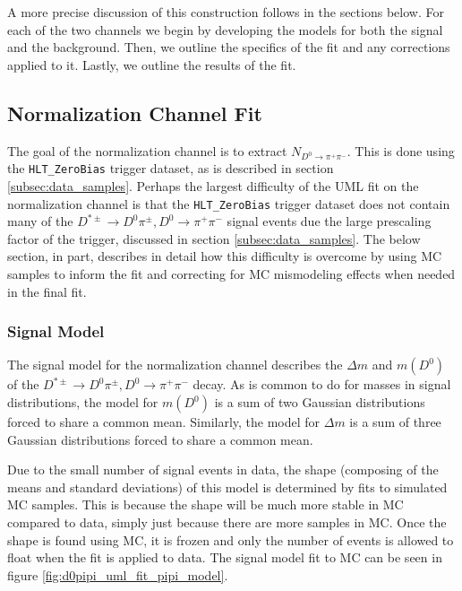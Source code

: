 A more precise discussion of this construction follows in the sections below. For each of the two channels we begin by developing the models for both the signal and the background. Then, we outline the specifics of the fit and any corrections applied to it. Lastly, we outline the results of the fit. 

\subsection{Normalization Channel Fit}
\label{subsec:normalization_channel_fit}

The goal of the normalization channel is to extract $N_{D^0 \to \pi^+ \pi^-}$. This is done using the \texttt{HLT\_ZeroBias} trigger dataset, as is described in section \ref{subsec:data_samples}. Perhaps the largest difficulty of the UML fit on the normalization channel is that the \texttt{HLT\_ZeroBias} trigger dataset does not contain many of the $D^{*\pm}\to D^0 \pi^\pm, D^0 \to \pi^+ \pi^-$ signal events due the large prescaling factor of the trigger, discussed in section \ref{subsec:data_samples}. The below section, in part, describes in detail how this difficulty is overcome by using MC samples to inform the fit and correcting for MC mismodeling effects when needed in the final fit. 

\subsubsection{Signal Model}

The signal model for the normalization channel describes the $\Delta m$ and $m(D^0)$ of the $D^{*\pm}\to D^0 \pi^\pm, D^0 \to \pi^+ \pi^-$ decay. As is common to do for masses in signal distributions, the model for $m(D^0)$ is a sum of two Gaussian distributions forced to share a common mean. Similarly, the model for $\Delta m$ is a sum of three Gaussian distributions forced to share a common mean.

Due to the small number of signal events in data, the shape (composing of the means and standard deviations) of this model is determined by fits to simulated MC samples. This is because the shape will be much more stable in MC compared to data, simply just because there are more samples in MC. Once the shape is found using MC, it is frozen and only the number of events is allowed to float when the fit is applied to data. The signal model fit to MC can be seen in figure \ref{fig:d0pipi_uml_fit_pipi_model}.

